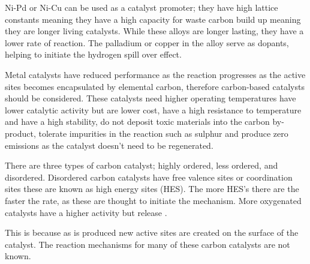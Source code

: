 Ni-Pd or Ni-Cu can be used as a catalyst promoter; they have high lattice constants meaning they have a high capacity for waste carbon build up meaning they are longer living catalysts.
While these alloys are longer lasting, they have a lower rate of reaction.
The palladium or copper in the alloy serve as dopants, helping to initiate the hydrogen spill over effect.

Metal catalysts have reduced performance as the reaction progresses as the active sites becomes encapsulated by elemental carbon, therefore carbon-based catalysts should be considered.
These catalysts need higher operating temperatures have lower catalytic activity but are lower cost, have a high resistance to temperature and have a high stability, do not deposit toxic materials into the carbon by-product, tolerate impurities in the reaction such as sulphur and produce zero  emissions as the catalyst doesn’t need to be regenerated.

There are three types of carbon catalyst; highly ordered, less ordered, and disordered.
Disordered carbon catalysts have free valence sites or coordination sites these are known as high energy sites (HES).
The more HES’s there are the faster the rate, as these are thought to initiate the mechanism.
More oxygenated catalysts have a higher activity but release .

This is because as  is produced new active sites are created on the surface of the catalyst.
The reaction mechanisms for many of these carbon catalysts are not known.
